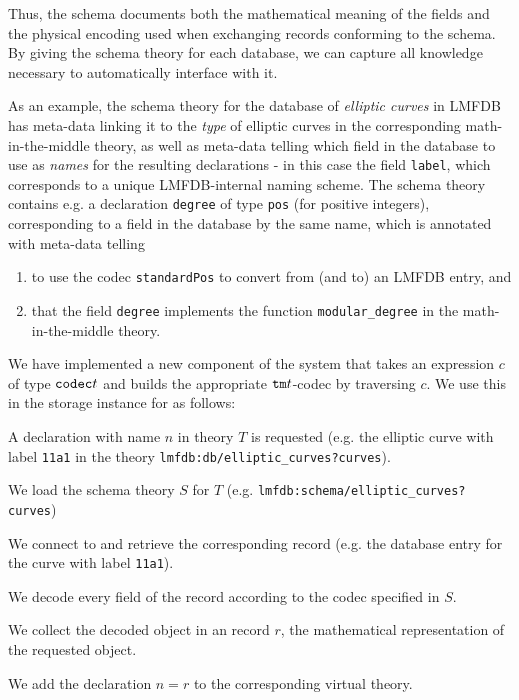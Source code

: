 Thus, the schema documents both the mathematical meaning of the fields and the physical encoding used when exchanging records conforming to the schema.
By giving the schema theory for each database, we can capture all knowledge necessary to automatically interface with it.

As an example, the schema theory for the database of \emph{elliptic curves} in LMFDB
has meta-data linking it to the \emph{type} of elliptic curves in the corresponding math-in-the-middle theory, as well as meta-data telling \MMT which field in the database to use as \emph{names} for the resulting \MMT declarations - in this case the field \texttt{label}, which corresponds to a unique LMFDB-internal naming scheme. The schema theory contains e.g. a declaration \texttt{degree} of type \texttt{pos} (for positive  integers), corresponding to a field in the database by the same name, which is annotated with meta-data telling \MMT
\begin{enumerate}
\item to use the codec \texttt{standardPos} to convert from (and to) an LMFDB entry, and
\item that the field \texttt{degree} implements the function \texttt{modular\_degree} in the math-in-the-middle theory.
\end{enumerate}

We have implemented a new component of the \MMT system that takes an expression $c$ of type $\codec t$ and builds the appropriate $\tm t$-codec by traversing $c$.
We use this in the storage instance for \LMFDB as follows:
\begin{compactenum}
 \item A declaration with name $n$ in theory $T$ is requested (e.g. the elliptic curve with label \texttt{11a1} in the theory \texttt{lmfdb:db/elliptic\_curves?curves}).
 \item We load the schema theory $S$ for $T$ (e.g. \texttt{lmfdb:schema/elliptic\_curves?curves})
 \item We connect to \LMFDB and retrieve the corresponding record (e.g. the database entry for the curve with label \texttt{11a1}).
 \item We decode every field of the record according to the codec specified in $S$.
 \item We collect the decoded \MMT object in an \MMT record $r$, the mathematical representation of the requested object.
 \item We add the declaration $n=r$ to the corresponding virtual theory.
\end{compactenum}



